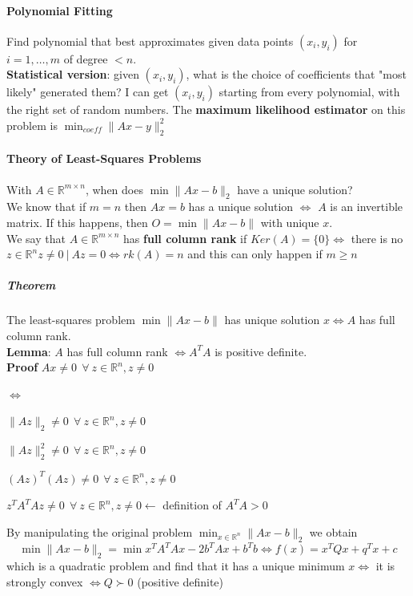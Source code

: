 \documentclass[10pt]{report}
\begin{document}
\paragraph{Polynomial Fitting} Find polynomial that best approximates given data points $(x_i,y_i)$ for $i=1,\ldots,m$ of degree $<n$.\\
\textbf{Statistical version}: given $(x_i, y_i)$, what is the choice of coefficients that "most likely" generated them? I can get $(x_i, y_i)$ starting from every polynomial, with the right set of random numbers. The \textbf{maximum likelihood estimator} on this problem is $\min_{coeff}\|Ax - y\|_2^2$
\paragraph{Theory of Least-Squares Problems} With $A \in \mathbb{R}^{m\times n}$, when does $\min \|Ax-b\|_2$ have a unique solution?\\
We know that if $m=n$ then $Ax = b$ has a unique solution $\Leftrightarrow$ $A$ is an invertible matrix. If this happens, then $O = \min\|Ax-b\|$ with unique $x$.\\
We say that $A\in \mathbb{R}^{m\times n}$ has \textbf{full column rank} if $Ker(A) = \{0\} \Leftrightarrow$ there is no $z\in \mathbb{R}^n z\neq 0\:|\:Az=0\Leftrightarrow rk(A) = n$ and this can only happen if $m\geq n$
\subparagraph{Theorem} The least-squares problem $\min \|Ax-b\|$ has unique solution $x\Leftrightarrow A$ has full column rank.\\
\textbf{Lemma}: $A$ has full column rank $\Leftrightarrow A^TA$ is positive definite.\\
\textbf{Proof} $Ax \neq 0\:\:\forall\:z\in \mathbb{R}^n, z\neq 0$
\begin{list}{$\Leftrightarrow$}{}
	\item $\|Az\|_2 \neq 0\:\:\forall\:z\in \mathbb{R}^n, z\neq 0$
	\item $\|Az\|_2^2 \neq 0\:\:\forall\:z\in \mathbb{R}^n, z\neq 0$
	\item $(Az)^T(Az)\neq 0\:\:\forall\:z\in \mathbb{R}^n, z\neq 0$
	\item $z^TA^TAz\neq 0\:\:\forall\:z\in \mathbb{R}^n, z\neq 0 \longleftarrow$ definition of $A^TA > 0$
\end{list}
By manipulating the original problem $\min_{x\in \mathbb{R}^n} \|Ax-b\|_2$ we obtain $$\min \|Ax-b\|_2 = \min x^TA^TAx - 2b^TAx + b^Tb \Leftrightarrow f(x) = x^TQx + q^Tx + c$$ which is a quadratic problem and find that it has a unique minimum $x \Leftrightarrow$ it is strongly convex $\Leftrightarrow Q \succ 0$ (positive definite)\\
\end{document}
